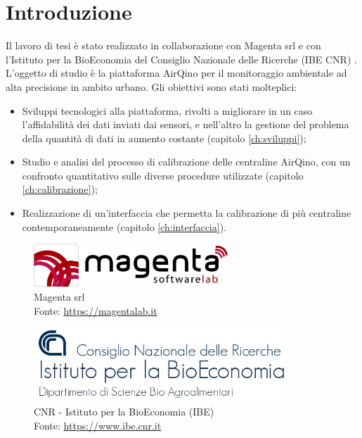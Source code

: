 \chapter{Introduzione}\label{ch:introduzione}
Il lavoro di tesi è stato realizzato in collaborazione con Magenta srl \cite{magenta} e con l'Istituto per la BioEconomia del Consiglio Nazionale delle Ricerche (IBE CNR) \cite{ibe}.\\

L'oggetto di studio è la piattaforma AirQino \cite{airqino} per il monitoraggio ambientale ad alta precisione in ambito urbano. Gli obiettivi sono stati molteplici:
\begin{itemize}
  \item Sviluppi tecnologici alla piattaforma, rivolti a migliorare in un caso l'affidabilità dei dati inviati dai sensori, e nell'altro la gestione del problema della quantità di dati in aumento costante (capitolo \ref{ch:sviluppi});
  \item Studio e analisi del processo di calibrazione delle centraline AirQino, con un confronto quantitativo sulle diverse procedure utilizzate (capitolo \ref{ch:calibrazione});
  \item Realizzazione di un'interfaccia che permetta la calibrazione di più centraline contemporaneamente  (capitolo \ref{ch:interfaccia}).
\end{itemize}

\begin{figure}[H]
\centering
\captionsetup{justification=centering}
\includegraphics[width=0.65\textwidth,height=\textheight,keepaspectratio]{img/magenta}
\caption{Magenta srl\\Fonte: \url{https://magentalab.it}}
\label{fig:magenta}
\end{figure}

\vspace{3mm}
\begin{figure}[H]
\centering
\captionsetup{justification=centering}
\includegraphics[width=0.85\textwidth,height=\textheight,keepaspectratio]{img/ibe.jpg}
\caption{CNR - Istituto per la BioEconomia (IBE)\\Fonte: \url{https://www.ibe.cnr.it}}
\label{fig:ibe}
\end{figure}

